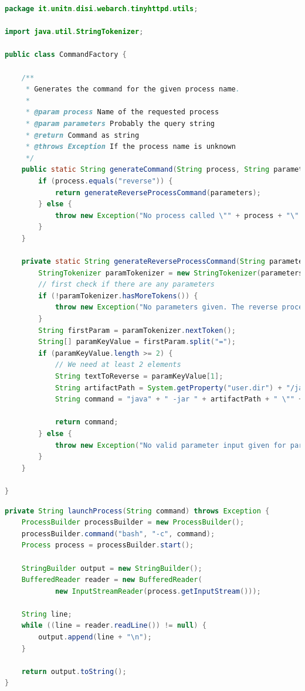 \documentclass{article}
\begin{document}
\begin{lstlisting}[label=lst:01_part1_impl_tinyhttpd_commandfactory, caption=CLI command to start a GitLab runner in a Docker container, language=java, numbers=none]
package it.unitn.disi.webarch.tinyhttpd.utils;

import java.util.StringTokenizer;

public class CommandFactory {

    /**
     * Generates the command for the given process name.
     *
     * @param process Name of the requested process
     * @param parameters Probably the query string
     * @return Command as string
     * @throws Exception If the process name is unknown
     */
    public static String generateCommand(String process, String parameters) throws Exception {
        if (process.equals("reverse")) {
            return generateReverseProcessCommand(parameters);
        } else {
            throw new Exception("No process called \"" + process + "\" available");
        }
    }

    private static String generateReverseProcessCommand(String parameters) throws Exception {
        StringTokenizer paramTokenizer = new StringTokenizer(parameters, "&");
        // first check if there are any parameters
        if (!paramTokenizer.hasMoreTokens()) {
            throw new Exception("No parameters given. The reverse process needs at least one parameter");
        }
        String firstParam = paramTokenizer.nextToken();
        String[] paramKeyValue = firstParam.split("=");
        if (paramKeyValue.length >= 2) {
            // We need at least 2 elements
            String textToReverse = paramKeyValue[1];
            String artifactPath = System.getProperty("user.dir") + "/jars/StringReverser.jar";
            String command = "java" + " -jar " + artifactPath + " \"" + textToReverse + "\"";

            return command;
        } else {
            throw new Exception("No valid parameter input given for parameters \"" + parameters + "\"");
        }
    }

}
\end{lstlisting}

\begin{lstlisting}[label=lst:01_part1_impl_tinyhttpd_launchprocess, caption=CLI command to start a GitLab runner in a Docker container, language=java, numbers=none]
private String launchProcess(String command) throws Exception {
    ProcessBuilder processBuilder = new ProcessBuilder();
    processBuilder.command("bash", "-c", command);
    Process process = processBuilder.start();

    StringBuilder output = new StringBuilder();
    BufferedReader reader = new BufferedReader(
            new InputStreamReader(process.getInputStream()));

    String line;
    while ((line = reader.readLine()) != null) {
        output.append(line + "\n");
    }

    return output.toString();
}
\end{lstlisting}
\end{document}
